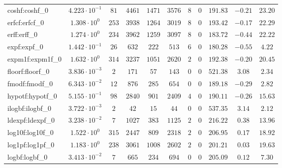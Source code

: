\begin{tabular}{|l|c|c|c|c|c|c|c|c|c|c|}
coshf:coshf\_0               & $ 4.223 \cdot 10^{-1} $ & $ 81     $ & $ 4461  $ & $ 1471  $ & $ 3576  $ & $ 8   $ & $ 0 $ & $ 191.83      $ & $ -0.21   $ & $ 23.20   $ \\
erfcf:erfcf\_0               & $ 1.308 \cdot 10^{0}  $ & $ 253    $ & $ 3938  $ & $ 1264  $ & $ 3019  $ & $ 8   $ & $ 0 $ & $ 193.42      $ & $ -0.17   $ & $ 22.29   $ \\
erff:erff\_0                 & $ 1.274 \cdot 10^{0}  $ & $ 234    $ & $ 3962  $ & $ 1259  $ & $ 3097  $ & $ 8   $ & $ 0 $ & $ 183.72      $ & $ -0.44   $ & $ 22.22   $ \\
expf:expf\_0                 & $ 1.442 \cdot 10^{-1} $ & $ 26     $ & $ 632   $ & $ 222   $ & $ 513   $ & $ 6   $ & $ 0 $ & $ 180.28      $ & $ -0.55   $ & $ 4.22    $ \\
expm1f:expm1f\_0             & $ 1.632 \cdot 10^{0}  $ & $ 314    $ & $ 3237  $ & $ 1051  $ & $ 2620  $ & $ 2   $ & $ 0 $ & $ 192.38      $ & $ -0.20   $ & $ 20.45   $ \\
floorf:floorf\_0             & $ 3.836 \cdot 10^{-3} $ & $ 2      $ & $ 171   $ & $ 57    $ & $ 143   $ & $ 0   $ & $ 0 $ & $ 521.38      $ & $ 3.08    $ & $ 2.34    $ \\
fmodf:fmodf\_0               & $ 6.343 \cdot 10^{-2} $ & $ 12     $ & $ 876   $ & $ 285   $ & $ 654   $ & $ 0   $ & $ 0 $ & $ 189.18      $ & $ -0.29   $ & $ 2.82    $ \\
hypotf:hypotf\_0             & $ 5.155 \cdot 10^{-1} $ & $ 98     $ & $ 2840  $ & $ 901   $ & $ 2409  $ & $ 4   $ & $ 0 $ & $ 190.11      $ & $ -0.26   $ & $ 15.63   $ \\
ilogbf:ilogbf\_0             & $ 3.722 \cdot 10^{-3} $ & $ 2      $ & $ 42    $ & $ 15    $ & $ 44    $ & $ 0   $ & $ 0 $ & $ 537.35      $ & $ 3.14    $ & $ 2.12    $ \\
ldexpf:ldexpf\_0             & $ 3.238 \cdot 10^{-2} $ & $ 7      $ & $ 1027  $ & $ 383   $ & $ 1125  $ & $ 2   $ & $ 0 $ & $ 216.22      $ & $ 0.38    $ & $ 13.96   $ \\
log10f:log10f\_0             & $ 1.522 \cdot 10^{0}  $ & $ 315    $ & $ 2447  $ & $ 809   $ & $ 2318  $ & $ 2   $ & $ 0 $ & $ 206.95      $ & $ 0.17    $ & $ 18.92   $ \\
log1pf:log1pf\_0             & $ 1.183 \cdot 10^{0}  $ & $ 238    $ & $ 3061  $ & $ 1008  $ & $ 2602  $ & $ 2   $ & $ 0 $ & $ 201.21      $ & $ 0.03    $ & $ 19.63   $ \\
logbf:logbf\_0               & $ 3.413 \cdot 10^{-2} $ & $ 7      $ & $ 665   $ & $ 234   $ & $ 694   $ & $ 0   $ & $ 0 $ & $ 205.09      $ & $ 0.12    $ & $ 7.30    $ \\

\end{tabular}
